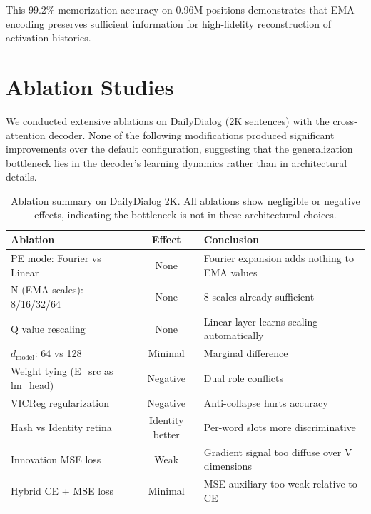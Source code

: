 \documentclass[11pt]{article}
\begin{document}
This 99.2\% memorization accuracy on 0.96M positions demonstrates that EMA encoding preserves sufficient information for high-fidelity reconstruction of activation histories.

\section{Ablation Studies}
\label{app:ablations}

We conducted extensive ablations on DailyDialog (2K sentences) with the cross-attention decoder. None of the following modifications produced significant improvements over the default configuration, suggesting that the generalization bottleneck lies in the decoder's learning dynamics rather than in architectural details.

\begin{table}[h]
\centering
\small
\begin{tabular}{l c l}
\toprule
Ablation & Effect & Conclusion \\
\midrule
PE mode: Fourier vs Linear & None & Fourier expansion adds nothing to EMA values \\
N (EMA scales): 8/16/32/64 & None & 8 scales already sufficient \\
Q value rescaling & None & Linear layer learns scaling automatically \\
$d_{\text{model}}$: 64 vs 128 & Minimal & Marginal difference \\
Weight tying (E\_src as lm\_head) & Negative & Dual role conflicts \\
VICReg regularization & Negative & Anti-collapse hurts accuracy \\
Hash vs Identity retina & Identity better & Per-word slots more discriminative \\
Innovation MSE loss & Weak & Gradient signal too diffuse over V dimensions \\
Hybrid CE + MSE loss & Minimal & MSE auxiliary too weak relative to CE \\
\bottomrule
\end{tabular}
\caption{Ablation summary on DailyDialog 2K. All ablations show negligible or negative effects, indicating the bottleneck is not in these architectural choices.}
\label{tab:ablations}
\end{table}
\end{document}
